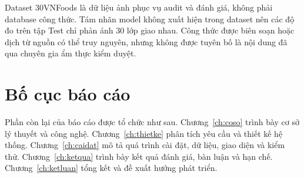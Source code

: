 Dataset 30VNFoods là dữ liệu ảnh phục vụ audit và đánh giá, không phải database
công thức. Tám nhãn model không xuất hiện trong dataset nên các độ đo trên tập
Test chỉ phản ánh 30 lớp giao nhau. Công thức được biên soạn hoặc dịch từ nguồn
có thể truy nguyên, nhưng không được tuyên bố là nội dung đã qua chuyên gia ẩm
thực kiểm duyệt.

\section{Bố cục báo cáo}

Phần còn lại của báo cáo được tổ chức như sau. Chương~\ref{ch:coso} trình
bày cơ sở lý thuyết và công nghệ. Chương~\ref{ch:thietke} phân tích yêu cầu
và thiết kế hệ thống. Chương~\ref{ch:caidat} mô tả quá trình cài đặt, dữ liệu,
giao diện và kiểm thử. Chương~\ref{ch:ketqua} trình bày kết quả đánh giá,
bàn luận và hạn chế. Chương~\ref{ch:ketluan} tổng kết và đề xuất hướng phát
triển.
